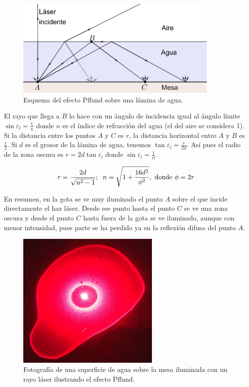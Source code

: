 \documentclass[12pt]{article}
\numberwithin{table}{section}
\numberwithin{figure}{section}
\numberwithin{equation}{section}
\DeclareMathOperator{\sen}{sin}
\begin{document}
\begin{figure}[!ht]
	\small \centering \sffamily
	\begin{center}
		\includegraphics[width=10cm]{P2PffAgua.png}
		\caption{Esquema del efecto Pffund sobre una lámina de agua.}
		\label{P2PffAgua}
	\end{center}
\end{figure}

El rayo que llega a $B$ lo hace con un ángulo de incidencia igual al ángulo límite $\sen\varepsilon_l=\frac{1}{n}$ donde $n$ es el índice de refracción del agua (el del aire se considera 1). Si la distancia entre los puntos $A$ y $C$ es $r$, la distancia horizontal entre $A$ y $B$ es $\frac{r}{2}$. Si $d$ es el grosor de la lámina de agua, tenemos $\tan\varepsilon_l=\frac{r}{2d}$. Así pues el radio de la zona oscura es $r=2d\tan\varepsilon_l$ donde $\sen\varepsilon_l=\frac{1}{n}$.

\begin{equation}\label{P2PffRadioParvo}
	r=\frac{2d}{\sqrt{n^2-1}};\hspace{2mm}n=\sqrt{1+\frac{16d^2}{\phi^2}},\text{ donde }\phi=2r
\end{equation}

En resumen, en la gota se ve muy iluminado el punto $A$ sobre el que incide directamente el haz láser. Desde ese punto hasta el punto $C$ se ve una zona oscura y desde el punto $C$ hasta fuera de la gota se ve iluminado, aunque con menor intensidad, pues parte se ha perdido ya en la reflexión difusa del punto $A$. 

\begin{figure}[!ht]
	\small \centering \sffamily
	\begin{center}
		\includegraphics[width=7cm]{P2PffAgua.jpeg}
		\caption{Fotografía de una superficie de agua sobre la mesa iluminada con un rayo láser ilustrando el efecto Pffund.}
		\label{P2PffFotoAgua}
	\end{center}
\end{figure}
\end{document}
